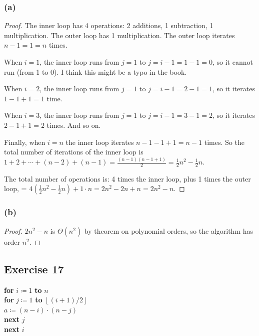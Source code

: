 \documentclass[14pt]{extarticle}
\newcommand{\floor}[1]{{\left\lfloor#1\right\rfloor}}
\begin{document}
\subsubsection{(a)}
\begin{proof}
    The inner loop has 4 operations: 2 additions, 1 subtraction, 1 multiplication. The outer loop has 1 multiplication. The outer
    loop iterates \(n-1=1 = n\) times.

    When \(i = 1\), the inner loop runs from \(j = 1\) to \(j = i-1 = 1-1 = 0\), so it cannot run (from 1 to 0). I think this
    might be a typo in the book.

    When \(i = 2\), the inner loop runs from \(j = 1\) to \(j = i-1 = 2-1 = 1\), so it iterates \(1 - 1 + 1 = 1\) time.

    When \(i = 3\), the inner loop runs from \(j = 1\) to \(j = i-1 = 3-1 = 2\), so it iterates \(2-1+1=2\) times. And so on.

    Finally, when \(i = n\) the inner loop iterates \(n-1 - 1 + 1 = n-1\) times. So the total number of iterations of the inner
    loop is \(1+2+\cdots+(n-2)+(n-1) = \frac{(n-1)(n-1+1)}{2} = \frac{1}{2}n^2 - \frac{1}{2}n\).

    The total number of operations is: 4 times the inner loop, plus 1 times the outer loop, = \(4\left(\frac{1}{2}n^2-
    \frac{1}{2}n\right) + 1 \cdot n = 2n^2 - 2n + n = 2n^2 - n\).
\end{proof}

\subsubsection{(b)}
\begin{proof}
    \(2n^2 - n\) is \(\Theta(n^2)\) by theorem on polynomial orders, so the algorithm has order \(n^2\).
\end{proof}

\subsection{Exercise 17}
\begin{tabbing}
    {\bf for} \= \(i \coloneqq 1\) {\bf to} \(n\) \\
    \> {\bf for} \= \(j \coloneqq 1\) {\bf to} \(\floor{(i+1)/2}\)\\
    \>           \> \(a \coloneqq (n-i)\cdot(n-j)\) \\
    \> {\bf next} \(j\) \\
    {\bf next} \(i\)
\end{tabbing}
\end{document}

